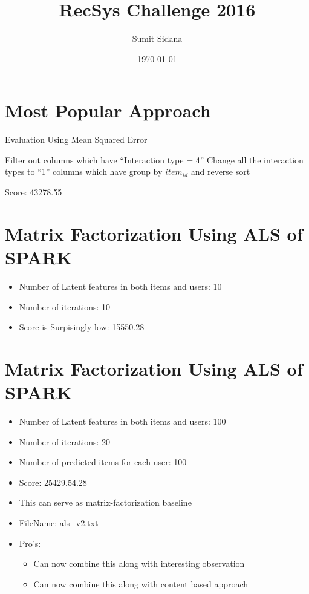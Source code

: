 \documentclass{article}
\begin{document}
\title{RecSys Challenge 2016}
\author{Sumit Sidana}
\date{\today}
\maketitle
\section{Most Popular Approach}

\begin{algorithm}
\caption{Evaluation Using Mean Squared Error}
\begin{algorithmic}[1] 
\State Filter out columns which have ``Interaction type = 4''
\State Change all the interaction types to ``1'' columns which have
\State group by $item_{id}$ and reverse sort
\end{algorithmic}
\end{algorithm}
Score: 43278.55

\section{Matrix Factorization Using ALS of SPARK}
\begin{itemize}
 \item Number of Latent features in both items and users: 10
 \item Number of iterations: 10
 \item Score is Surpisingly low:  15550.28
\end{itemize}

\section{Matrix Factorization Using ALS of SPARK}
\begin{itemize}
 \item Number of Latent features in both items and users: 100
 \item Number of iterations: 20
 \item Number of predicted items for each user: 100
 \item Score:  25429.54.28
 \item This can serve as matrix-factorization baseline
 \item FileName: als\_v2.txt
 \item Pro's:
 \begin{itemize}
 \item Can now combine this along with interesting observation
 \item Can now combine this along with content based approach
 \end{itemize}
 
\end{itemize}
\end{document}

